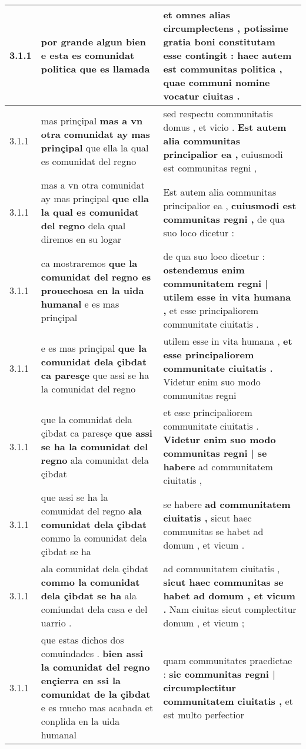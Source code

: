 \begin{tabular}{|p{1cm}|p{6.5cm}|p{6.5cm}|}
3.1.1 & por grande algun bien \textbf{ e esta es comunidat politica } que es llamada & et omnes alias circumplectens , potissime gratia boni constitutam esse contingit : \textbf{ haec autem est communitas politica , } quae communi nomine vocatur ciuitas . \\\hline
3.1.1 & mas prinçipal \textbf{ mas a vn otra comunidat ay mas prinçipal } que ella la qual es comunidat del regno & sed respectu communitatis domus , et vicio . \textbf{ Est autem alia communitas principalior ea , } cuiusmodi est communitas regni , \\\hline
3.1.1 & mas a vn otra comunidat ay mas prinçipal \textbf{ que ella la qual es comunidat del regno } dela qual diremos en su logar & Est autem alia communitas principalior ea , \textbf{ cuiusmodi est communitas regni , } de qua suo loco dicetur : \\\hline
3.1.1 & ca mostraremos \textbf{ que la comunidat del regno es prouechosa en la uida humanal } e es mas prinçipal & de qua suo loco dicetur : \textbf{ ostendemus enim communitatem regni | utilem esse in vita humana , } et esse principaliorem communitate ciuitatis . \\\hline
3.1.1 & e es mas prinçipal \textbf{ que la comunidat dela çibdat ca paresçe } que assi se ha la comunidat del regno & utilem esse in vita humana , \textbf{ et esse principaliorem communitate ciuitatis . } Videtur enim suo modo communitas regni \\\hline
3.1.1 & que la comunidat dela çibdat ca paresçe \textbf{ que assi se ha la comunidat del regno } ala comunidat dela çibdat & et esse principaliorem communitate ciuitatis . \textbf{ Videtur enim suo modo communitas regni | se habere } ad communitatem ciuitatis , \\\hline
3.1.1 & que assi se ha la comunidat del regno \textbf{ ala comunidat dela çibdat } commo la comunidat dela çibdat se ha & se habere \textbf{ ad communitatem ciuitatis , } sicut haec communitas se habet ad domum , et vicum . \\\hline
3.1.1 & ala comunidat dela çibdat \textbf{ commo la comunidat dela çibdat se ha } ala comiundat dela casa e del uarrio . & ad communitatem ciuitatis , \textbf{ sicut haec communitas se habet ad domum , et vicum . } Nam ciuitas sicut complectitur domum , et vicum ; \\\hline
3.1.1 & que estas dichos dos comuindades . \textbf{ bien assi la comunidat del regno ençierra en ssi la comunidat de la çibdat } e es mucho mas acabada et conplida en la uida humanal & quam communitates praedictae : \textbf{ sic communitas regni | circumplectitur communitatem ciuitatis , } et est multo perfectior \\\hline

\end{tabular}
